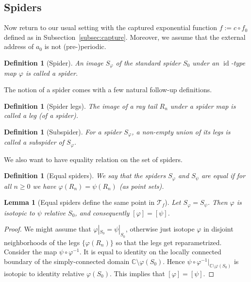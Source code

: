 \documentclass[10pt,reqno,a4paper]{amsart}
\numberwithin{figure}{section}
\numberwithin{equation}{section}
\newtheorem{defn}[thm]{Definition}
\newtheorem{lmm}[thm]{Lemma}
\newcommand{\id}{\operatorname{id}}
\begin{document}
\subsection{Spiders}
\label{subsec:spiders}

Now return to our usual setting with the captured exponential function $f:=c\circ f_0$ defined as in Subsection~\ref{subsec:capture}. Moreover, we assume that the external address of $a_0$ is not (pre-)periodic.

\begin{defn}[Spider]
	\label{defn:spider}
	An image $S_{\varphi}$ of the standard spider $S_0$ under an $\id$-type map $\varphi$ is called a \emph{spider}.	
\end{defn}

The notion of a spider comes with a few natural follow-up definitions.

\begin{defn}[Spider legs]
	The image of a ray tail $R_n$ under a spider map is called a \emph{leg} (of a spider).
\end{defn}

\begin{defn}[Subspider]
	For a spider $S_\varphi$, a non-empty union of its legs is called a \emph{subspider} of $S_\varphi$.
\end{defn}

We also want to have equality relation on the set of spiders.

\begin{defn}[Equal spiders]
	We say that the spiders $S_\varphi$ and $S_\psi$ are equal if for all $n\geq 0$ we have $\varphi(R_n)=\psi(R_n)$ (as point sets).
\end{defn}

\begin{lmm}[Equal spiders define the same point in $\mathcal{T}_f$]
	\label{lmm:equal_spiders}
	Let $S_\varphi=S_\psi$. Then $\varphi$ is isotopic to $\psi$ relative $S_0$, and consequently $[\varphi]=[\psi]$.	
\end{lmm}
\begin{proof}
	We might assume that $\varphi|_{S_0}=\psi|_{S_0}$, otherwise just isotope $\varphi$ in disjoint neighborhoods of the legs $\{\varphi(R_n)\}$ so that the legs get reparametrized. Consider the map $\psi\circ\varphi^{-1}$. It is equal to identity on the locally connected boundary of the simply-connected domain $\mathbb{C}\setminus\varphi(S_0)$. Hence $\psi\circ\varphi^{-1}|_{\mathbb{C}\setminus\varphi(S_0)}$ is isotopic to identity relative $\varphi(S_0)$. This implies that $[\varphi]=[\psi]$.  	
\end{proof}
\end{document}
